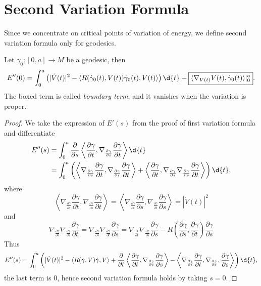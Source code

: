 \section{Second Variation Formula}

Since we concentrate on critical points of variation of energy, we define second variation formula only for geodesics.

\begin{prop}
    Let $\gamma_0:[0,a]\to M$ be a geodesic, then
    \[E''(0)=\int_0^a\left(|\dot{V}(t)|^2-\langle R(\dot{\gamma}_0(t),V(t))\dot{\gamma}_0(t),V(t)\rangle\right)\d{t}+\boxed{\langle\nabla_{V(t)}V(t),\dot{\gamma}_0(t)\rangle|_0^a}.\]
    The boxed term is called \emph{boundary term}, and it vanishes when the variation is proper.
\end{prop}
\begin{proof}
    We take the expression of $E'(s)$ from the proof of first variation formula and differentiate
    \begin{align*}
        E''(s)&=\int_0^a\frac{\partial{}}{\partial{s}}\left\langle\frac{\partial\gamma}{\partial{t}},\nabla_{\frac{\partial{\gamma}}{\partial{s}}}\frac{\partial\gamma}{\partial{t}}\right\rangle\d{t}\\
        &=\int_0^a\left(\left\langle\nabla_{\frac{\partial{\gamma}}{\partial{s}}}\frac{\partial{\gamma}}{\partial{t}},\nabla_{\frac{\partial{\gamma}}{\partial{s}}}\frac{\partial{\gamma}}{\partial{t}}\right\rangle+\left\langle\frac{\partial\gamma}{\partial{t}},\nabla_{\frac{\partial{\gamma}}{\partial{s}}}\nabla_{\frac{\partial{\gamma}}{\partial{s}}}\frac{\partial{\gamma}}{\partial{t}}\right\rangle\right)\d{t},
    \end{align*}
    where
    \[\left\langle\nabla_{\frac{\partial{\gamma}}{\partial{s}}}\frac{\partial{\gamma}}{\partial{t}},\nabla_{\frac{\partial{\gamma}}{\partial{s}}}\frac{\partial{\gamma}}{\partial{t}}\right\rangle=\left\langle\nabla_{\frac{\partial{\gamma}}{\partial{t}}}\frac{\partial{\gamma}}{\partial{s}},\nabla_{\frac{\partial{\gamma}}{\partial{t}}}\frac{\partial{\gamma}}{\partial{s}}\right\rangle=|\dot{V}(t)|^2\]
    and
    \[\nabla_{\frac{\partial{\gamma}}{\partial{s}}}\nabla_{\frac{\partial{\gamma}}{\partial{s}}}\frac{\partial{\gamma}}{\partial{t}}=\nabla_{\frac{\partial{\gamma}}{\partial{s}}}\nabla_{\frac{\partial{\gamma}}{\partial{t}}}\frac{\partial{\gamma}}{\partial{s}}=\nabla_{\frac{\partial{}}{\partial{t}}}\nabla_{\frac{\partial{\gamma}}{\partial{s}}}\frac{\partial{\gamma}}{\partial{s}}-R\left(\frac{\partial\gamma}{\partial{s}},\frac{\partial\gamma}{\partial{t}}\right)\frac{\partial\gamma}{\partial{s}}\]
    Thus
    \[E''(s)=\int_0^a\left(|\dot{V}(t)|^2-\langle R(\dot{\gamma},V)\dot{\gamma},V\rangle+\frac{\partial{}}{\partial{t}}\left\langle\frac{\partial{\gamma}}{\partial{t}},\nabla_{\frac{\partial\gamma}{\partial{s}}}\frac{\partial{\gamma}}{\partial{s}}\right\rangle-{\left\langle\nabla_{\frac{\partial\gamma}{\partial{t}}}\frac{\partial\gamma}{\partial{t}},\nabla_{\frac{\partial\gamma}{\partial{s}}},\frac{\partial{\gamma}}{\partial{s}}\right\rangle}\right)\d{t},\]
    the last term is $0$, hence second variation formula holds by taking $s=0$.
\end{proof}

